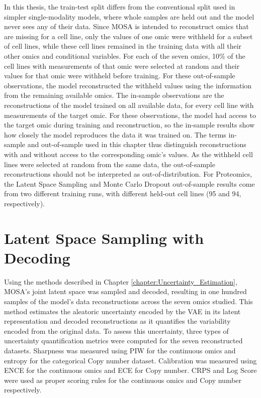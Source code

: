 In this thesis, the train-test split differs from the conventional split used in simpler single-modality models, where whole samples are held out and the model never sees any of their data. Since MOSA is intended to reconstruct omics that are missing for a cell line, only the values of one omic were withheld for a subset of cell lines, while these cell lines remained in the training data with all their other omics and conditional variables. For each of the seven omics, 10\% of the cell lines with measurements of that omic were selected at random and their values for that omic were withheld before training. For these out-of-sample observations, the model reconstructed the withheld values using the information from the remaining available omics. The in-sample observations are the reconstructions of the model trained on all available data, for every cell line with measurements of the target omic. For these observations, the model had access to the target omic during training and reconstruction, so the in-sample results show how closely the model reproduces the data it was trained on. The terms in-sample and out-of-sample used in this chapter thus distinguish reconstructions with and without access to the corresponding omic's values. As the withheld cell lines were selected at random from the same data, the out-of-sample reconstructions should not be interpreted as out-of-distribution. For Proteomics, the Latent Space Sampling and Monte Carlo Dropout out-of-sample results come from two different training runs, with different held-out cell lines (95 and 94, respectively).

\section{Latent Space Sampling with Decoding} \label{LSS_Analysis}

Using the methods described in Chapter \ref{chapter:Uncertainty_Estimation}, MOSA's joint latent space was sampled and decoded, resulting in one hundred samples of the model's data reconstructions across the seven omics studied. This method estimates the aleatoric uncertainty encoded by the VAE in its latent representation and decoded reconstructions as it quantifies the variability encoded from the original data. To assess this uncertainty, three types of uncertainty quantification metrics were computed for the seven reconstructed datasets. Sharpness was measured using PIW for the continuous omics and entropy for the categorical Copy number dataset. Calibration was measured using ENCE for the continuous omics and ECE for Copy number. CRPS and Log Score were used as proper scoring rules for the continuous omics and Copy number respectively.

